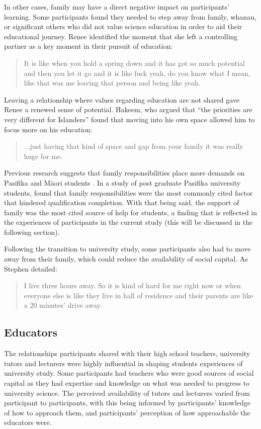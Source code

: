 In other cases, family may have a direct negative impact on participants' learning. Some participants found they needed to step away from family, whanau, or significant others who did not value science education in order to aid their educational journey. Renee identified the moment that she left a controlling partner as a key moment in their pursuit of education: \blockquote{It is like when you hold a spring down and it has got so much potential and then you let it go and it is like fuck yeah, do you know what I mean, like that was me leaving that person and being like yeah.}. Leaving a relationship where values regarding education are not shared gave Renee a renewed sense of potential. Hakeem, who argued that ``the priorities are very different for Islanders'' found that moving into his own space allowed him to focus more on his education: \blockquote{...just having that kind of space and gap from your family it was really huge for me.} Previous research suggests that family responsibilities place more demands on Pasifika and M\={a}ori students \citep{zepke2011non}. In a study of post graduate Pasifika university students, \cite{theodore2018pacific} found that family responsibilities were the most commonly cited factor that hindered qualification completion. With that being said, the support of family was the most cited source of help for students, a finding that is reflected in the experiences of participants in the current study (this will be discussed in the following section). 

Following the transition to university study, some participants also had to move away from their family, which could reduce the availability of social capital. As Stephen detailed: \blockquote{I live three hours away. So it is kind of hard for me right now or when everyone else is like they live in hall of residence and their parents are like a 20 minutes’ drive away.} 

\subsection{Educators}
The relationships participants shared with their high school teachers, university tutors and lecturers were highly influential in shaping students experiences of university study. Some participants had teachers who were good sources of social capital as they had expertise and knowledge on what was needed to progress to university science. The perceived availability of tutors and lecturers varied from participant to participants, with this being informed by participants' knowledge of how to approach them, and participants' perception of how approachable the educators were. 


